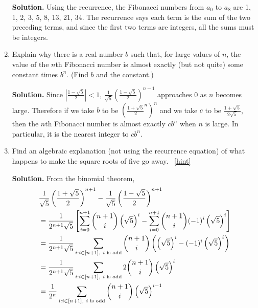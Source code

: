\documentclass{book}
\begin{document}
\begin{activity}[]
\begin{enumerate}[font=\bfseries,label=(\alph*),ref=\alph*]
\par\smallskip%
\noindent\textbf{Solution.}\hypertarget{solution-207}{}\quad%
\hypertarget{p-1441}{}%
Using the recurrence, the Fibonacci numbers from \(a_0\) to \(a_8\) are 1, 1, 2, 3, 5, 8, 13, 21, 34. The recurrence says each term is the sum of the two preceding terms, and since the first two terms are integers, all the sums must be integers.%
\item\label{task-252} \hypertarget{p-1442}{}%
Explain why there is a real number \(b\) such that, for large values of \(n\), the value of the \(n\)th Fibonacci number is almost exactly (but not quite) some constant times \(b^n\). (Find \(b\) and the constant.)%
\par\smallskip%
\noindent\textbf{Solution.}\hypertarget{solution-208}{}\quad%
\hypertarget{p-1443}{}%
Since \(\displaystyle \left|\frac{1-\sqrt{5}}{2}\right| \lt 1\), \(\displaystyle\frac{1}{\sqrt{5}}\left(\frac{1-\sqrt{5}}{2}\right)^{n-1}\) approaches 0 as \(n\) becomes large. Therefore if we take \(b\) to be \(\displaystyle \left(\frac{1+\sqrt{5}}{2}^n\right)^n\) and we take \(c\) to be \(\frac{1+\sqrt{5}}{2\sqrt{5}}\), then the \(n\)th Fibonacci number is almost exactly \(cb^n\) when \(n\) is large. In particular, it is the nearest integer to \(cb^n\).%
\item\label{task-253} \hypertarget{p-1444}{}%
Find an algebraic explanation (not using the recurrence equation) of what happens to make the square roots of five go away.%
~\hfill{\tiny\hyperlink{a-269.d}{[hint]}\hypertarget{q-269.d}{}}\par\smallskip%
\noindent\textbf{Solution.}\hypertarget{solution-209}{}\quad%
\hypertarget{p-1446}{}%
From the binomial theorem,%
\begin{align*}
\amp \frac{1}{\sqrt{5}}\left(\frac{1+\sqrt{5}}{   2}\right)^{n+1}- \frac{1}{\sqrt{5}}\left(\frac{1-\sqrt{5}}{2}\right)^{n+1}\\
\amp=
\frac{1}{2^{n+1}\sqrt{5}}\left[\sum_{i=0}^{n+1}\binom{n+1}{i}\left(\sqrt{5}\right)^i -\sum_{i=0}^{n+1} \binom{n+1}{i}(-1)^i\left(\sqrt{5}\right)^i\right]\\
\amp= \frac{1}{2^{n+1}\sqrt{5}}\sum_{i:i\in
[n+1],\ i\mbox{\scriptsize~is odd} }\binom{n+1}{i}\left(\left(\sqrt{5}\right)^i
-(-1)^i\left(\sqrt{5}\right)^i\right)\\
\amp= \frac{1}{2^{n+1}\sqrt{5}}\sum_{i:i\in[n+1],\ i\mbox{\scriptsize~is
odd} }  2\binom{n+1}{i}\left(\sqrt{5}\right)^i\\
\amp= \frac{1}{2^{n}}\sum_{i:i\in[n+1],\ i\mbox{\scriptsize~is
odd} }  \binom{n+1}{i}\left(\sqrt{5}\right)^{i-1}\\

\end{align*}
\end{enumerate}
\end{activity}
\end{document}
